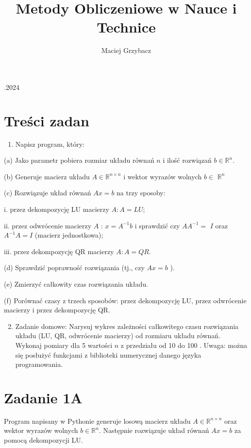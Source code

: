 \documentclass[10pt]{article}
\title{Metody Obliczeniowe w Nauce i Technice }
\author{Maciej Grzybacz}
\date{}
\begin{document}
 .2024

\section*{Treści zadan}
\begin{enumerate}
  \item Napisz program, który:
\end{enumerate}

(a) Jako parametr pobiera rozmiar układu równań $n$ i ilość rozwiązań $b \in \mathbb{R}^{n}$.

(b) Generuje macierz układu $A \in \mathbb{R}^{n \times n}$ i wektor wyrazów wolnych $b \in$ $\mathbb{R}^{n}$

(c) Rozwiązuje układ równań $A x=b$ na trzy sposoby:

i. przez dekompozycję LU macierzy $A: A=L U$;

ii. przez odwrócenie macierzy $A$ : $x=A^{-1} b$ i sprawdzić czy $A A^{-1}=$ $I$ oraz $A^{-1} A=I$ (macierz jednostkowa);

iii. przez dekompozycję QR macierzy $A: A=Q R$.

(d) Sprawdzić poprawność rozwiązania (tj., czy $A x=b$ ).

(e) Zmierzyć całkowity czas rozwiązania układu.

(f) Porównać czasy z trzech sposobów: przez dekompozycję LU, przez odwrócenie macierzy i przez dekompozycję QR.

\begin{enumerate}
  \setcounter{enumi}{1}
  \item Zadanie domowe: Narysuj wykres zależności całkowitego czasu rozwiązania układu (LU, QR, odwrócenie macierzy) od rozmiaru układu równań. Wykonaj pomiary dla 5 wartości $n$ z przedziału od 10 do 100 . Uwaga: można się posłużyć funkcjami z biblioteki numerycznej danego języka programowania.
\end{enumerate}

\section*{Zadanie 1A}
Program napisany w Pythonie generuje losową macierz układu $A \in \mathbb{R}^{n \times n}$ oraz wektor wyrazów wolnych $b \in \mathbb{R}^{n}$. Następnie rozwiązuje układ równań $A x=b$ za pomocą dekompozycji LU.
\end{document}
